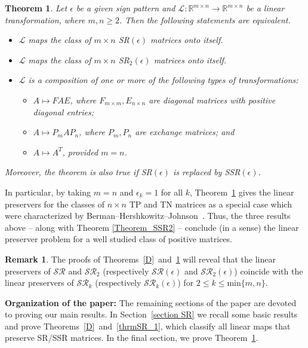 \documentclass[11pt,reqno]{amsart}
\theoremstyle{plain}
\newtheorem{utheorem}{\textrm{\textbf{Theorem}}}
\theoremstyle{definition}
\newtheorem{rem}[theorem]{Remark}
\numberwithin{equation}{section}
\begin{document}
\begin{utheorem}\label{F}
	Let $\epsilon$ be a given sign pattern and $\mathcal{L}:\mathbb{R}^{m\times n}\to\mathbb{R}^{m\times n}$ be a linear transformation, where  $m,n\geq2$. Then the following statements are equivalent.
	\begin{itemize}
		\item[(1)] $\mathcal{L}$ maps the class of $m\times n$ SR$(\epsilon)$ matrices onto itself.
		\item[(2)] $\mathcal{L}$ maps the class of $m\times n$ SR$_2(\epsilon)$ matrices onto itself.
		\item[(3)] $\mathcal{L}$ is a composition of one or more of the following types of transformations:
		\begin{itemize}
			\item[(a)] $A\mapsto FAE$, where $F_{m\times m}, E_{n\times n}$ are diagonal matrices with positive diagonal entries;
			\item[(b)] $A\mapsto P_mAP_n$, where $P_m, P_n$ are exchange matrices; and
			\item[(c)] $A\mapsto A^T$, provided $m=n$.
		\end{itemize}
	\end{itemize}
	Moreover, the theorem is also true if SR$(\epsilon)$ is replaced by SSR$(\epsilon)$.
\end{utheorem}

In particular, by taking $m=n$ and  $\epsilon_k=1$ for all $k$, Theorem~\ref{F} gives the linear preservers for the classes of $n\times n$ TP and TN matrices as a special case which were characterized by
Berman--Hershkowitz--Johnson~\cite{BHJ85}. Thus, the three results above -- along with Theorem \ref{Theorem_SSR2} -- conclude (in a sense) the linear preserver problem for a well studied class of positive matrices.

\begin{rem}
The proofs of Theorems~\ref{D}~and~\ref{F} will reveal that the linear preservers of $\mathcal{SR}$ and $\mathcal{SR}_2$ (respectively $\mathcal{SR}(\epsilon)$ and $\mathcal{SR}_2(\epsilon)$) coincide with the linear preservers of
$\mathcal{SR}_k$ (respectively $\mathcal{SR}_k(\epsilon)$) for $2\leq k\leq\mathrm{min}\{m,n\}$.
\end{rem}

\textbf{Organization of the paper:} The remaining sections of the paper are devoted to proving our main results. In Section~\ref{section SR} we recall some basic results and prove Theorems~\ref{D}~and~\ref{thrmSR_1}, which classify all linear maps that preserve SR/SSR matrices. In the final section, we prove Theorem~\ref{F}.
\end{document}
